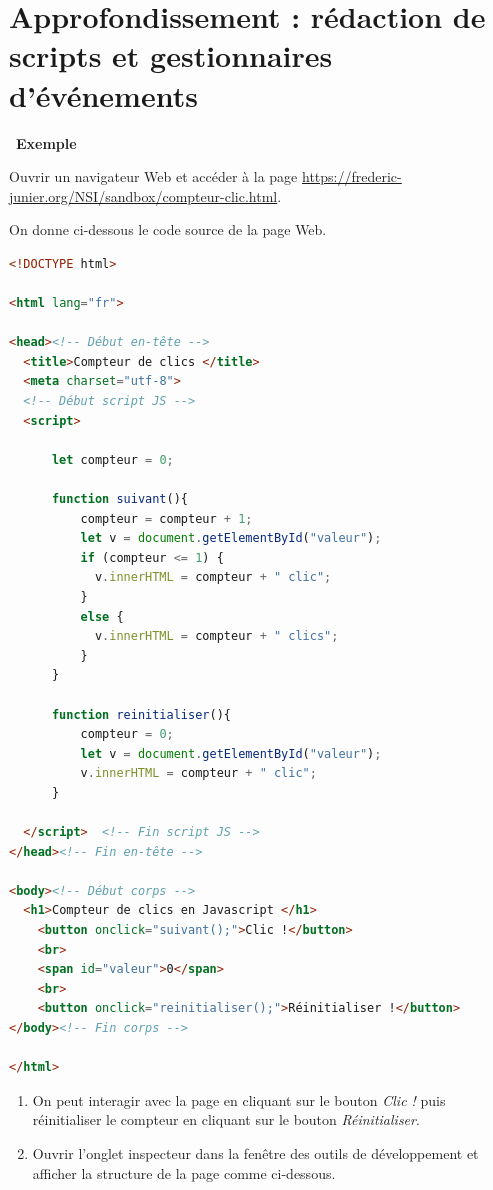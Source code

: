 \documentclass[
  11pt,
]{article}
\newcounter{def}
\newcounter{exple}
\newenvironment{exemple}[1]
{\par \medskip   \addtocounter{exple}{1} \noindent  
\begin{bclogo}[arrondi =0.1,   noborder = true, logo=\bclampe, marge=4]{~\textbf{Exemple} \textbf{\theexple} {\itshape #1} }  \par}
{
\end{bclogo}
 \par \bigskip }
\begin{document}
\hypertarget{approfondissement-ruxe9daction-de-scripts-et-gestionnaires-duxe9vuxe9nements}{%
\section{Approfondissement : rédaction de scripts et gestionnaires
d'événements}\label{approfondissement-ruxe9daction-de-scripts-et-gestionnaires-duxe9vuxe9nements}}

\begin{exemple}{}

Ouvrir un navigateur Web et accéder à la page
\url{https://frederic-junier.org/NSI/sandbox/compteur-clic.html}.

On donne ci-dessous le code source de la page Web.

\begin{lstlisting}[language=HTML]
<!DOCTYPE html>

<html lang="fr">

<head><!-- Début en-tête -->
  <title>Compteur de clics </title>
  <meta charset="utf-8">
  <!-- Début script JS --> 
  <script>  

      let compteur = 0;

      function suivant(){
          compteur = compteur + 1;
          let v = document.getElementById("valeur");
          if (compteur <= 1) {
            v.innerHTML = compteur + " clic";
          }
          else {
            v.innerHTML = compteur + " clics";
          }          
      }

      function reinitialiser(){
          compteur = 0;
          let v = document.getElementById("valeur");
          v.innerHTML = compteur + " clic";
      }

  </script>  <!-- Fin script JS -->
</head><!-- Fin en-tête -->
 
<body><!-- Début corps -->   
  <h1>Compteur de clics en Javascript </h1>
    <button onclick="suivant();">Clic !</button>
    <br>
    <span id="valeur">0</span>
    <br>
    <button onclick="reinitialiser();">Réinitialiser !</button>
</body><!-- Fin corps -->

</html> 
\end{lstlisting}

\begin{enumerate}
\def\labelenumi{\arabic{enumi}.}
\item
  On peut interagir avec la page en cliquant sur le bouton \emph{Clic !}
  puis réinitialiser le compteur en cliquant sur le bouton
  \emph{Réinitialiser}.
\item
  Ouvrir l'onglet inspecteur dans la fenêtre des outils de développement
  et afficher la structure de la page comme ci-dessous.


\end{enumerate}
\end{exemple}
\end{document}
